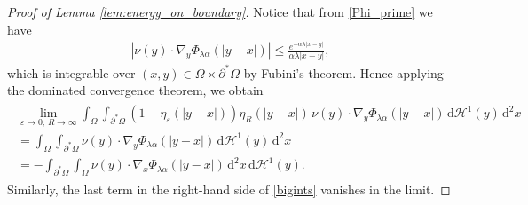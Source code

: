 \documentclass[11pt]{article}
\numberwithin{statement}{section}
\numberwithin{equation}{section}
\theoremstyle{remark}
\newcommand{\intd}{\, \mathrm{d}} 				%
\newcommand{\Hd}{\mathcal H}				%
\newcommand{\eps}{\varepsilon}
\begin{document}
\begin{proof}[Proof of Lemma \ref{lem:energy_on_boundary}]
    Notice that from \eqref{Phi_prime} we have
    \begin{align}\label{fubini}
      |\nu(y) \cdot \nabla_y \Phi_{\lambda
      \alpha}(|y-x|)| \leq \frac{e^{-\alpha \lambda |x -
      y|}}{\alpha \lambda |x-y|}, 
    \end{align}
    which is integrable over
    $(x,y) \in \Omega \times \partial^* \Omega$ by Fubini's
    theorem. Hence applying the dominated convergence theorem, we
    obtain
    \begin{align}\label{eq:main_term}
      \begin{split}
        \lim_{\eps \to 0, \, R \to \infty} \int_\Omega
        \int_{\partial^* \Omega} (1 - \eta_\eps(|y - x|)) \eta_R(|y -
        x|) \, \nu(y) \cdot \nabla_y \Phi_{\lambda
          \alpha}(|y - x|) \intd \mathcal H^1(y)  \intd^2 x  \\
        = \int_\Omega \int_{\partial^* \Omega} \nu(y) \cdot \nabla_y
        \Phi_{\lambda
          \alpha}(|y - x|) \intd \mathcal H^1(y)  \intd^2 x \\
        = - \int_{\partial^* \Omega} \int_{\Omega} \nu(y) \cdot
        \nabla_x \Phi_{\lambda \alpha}(|y-x|)\intd^2 x \intd
        \Hd^1(y).
     \end{split}
    \end{align}
    Similarly, the last term in the right-hand side of \eqref{bigints}
    vanishes in the limit.
    

\end{proof}
\end{document}
